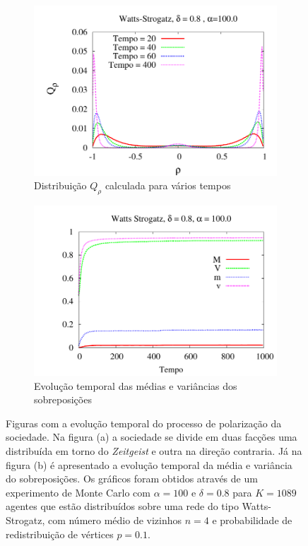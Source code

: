 \begin{figure} 
  \centering
  \begin{subfigure}[]{0.8\textwidth}
  \includegraphics[width = \textwidth]{Figures/Histograma_Watts_Strogatz_Polariza}
  \caption{Distribuição $Q_\rho$ calculada para vários tempos}
  \end{subfigure}
  \begin{subfigure}[]{0.7\textwidth}
  \includegraphics[width = \textwidth]{Figures/MagTempo_Polariza}
  \newline
  \caption{Evolução temporal das médias e variâncias dos sobreposições}
  \end{subfigure}
  \newline
  \caption{
      Figuras com a evolução temporal do processo de polarização da
  sociedade. Na figura (a) a sociedade se divide em duas facções
  uma distribuída em torno do \textit{Zeitgeist} e outra na direção
  contraria. Já na figura (b) é apresentado a evolução
  temporal da média e variância do sobreposições. Os gráficos foram
  obtidos através de um experimento de Monte Carlo com $\alpha = 100$
  e $\delta = 0.8$ para $K = 1089$ agentes que estão distribuídos sobre
  uma rede do tipo Watts-Strogatz, com número médio de vizinhos $n=4$
  e probabilidade de redistribuição de vértices $p=0.1$.
  }
  \label{fig:Pol}
\end{figure}

